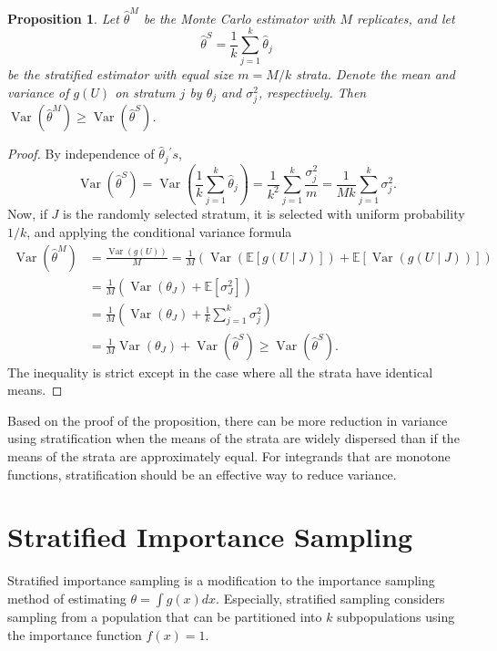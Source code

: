 \documentclass[11pt]{article}
\newtheorem{proposition}{Proposition}
\begin{document}
\begin{proposition}
Let $\widehat{\theta}^{M}$ be the Monte Carlo estimator with $M$ replicates, and let
\[
\widehat{\theta}^{S}=\frac{1}{k} \sum_{j=1}^{k} \widehat{\theta}_{j}
\]
be the stratified estimator with equal size $m=M / k$ strata. Denote the mean and variance of $g(U)$ on stratum $j$ by $\theta_{j}$ and $\sigma_{j}^{2}$, respectively. Then $\operatorname{Var}\left(\widehat{\theta}^{M}\right) \geq \operatorname{Var}\left(\widehat{\theta}^{S}\right)$.
\end{proposition}
\begin{proof}
By independence of $\widehat{\theta}_{j}{ }^{\prime} s$,
\[
\operatorname{Var}\left(\widehat{\theta}^{S}\right)=\operatorname{Var}\left(\frac{1}{k} \sum_{j=1}^{k} \widehat{\theta}_{j}\right)=\frac{1}{k^{2}} \sum_{j=1}^{k} \frac{\sigma_{j}^{2}}{m}=\frac{1}{M k} \sum_{j=1}^{k} \sigma_{j}^{2}.
\]
Now, if $J$ is the randomly selected stratum, it is selected with uniform probability $1 / k$, and applying the conditional variance formula
\begin{align*}
\operatorname{Var}\left(\widehat{\theta}^{M}\right) &=\frac{\operatorname{Var}(g(U))}{M}=\frac{1}{M}(\operatorname{Var}(\mathbb{E}[g(U \mid J)])+\mathbb{E}[\operatorname{Var}(g(U \mid J))])\\
&=\frac{1}{M}\left(\operatorname{Var}\left(\theta_{J}\right)+\mathbb{E}\left[\sigma_{J}^{2}\right]\right) \\
&=\frac{1}{M}\left(\operatorname{Var}\left(\theta_{J}\right)+\frac{1}{k} \sum_{j=1}^{k} \sigma_{j}^{2}\right) \\
&=\frac{1}{M} \operatorname{Var}\left(\theta_{J}\right)+\operatorname{Var}\left(\widehat{\theta}^{S}\right) \geq \operatorname{Var}\left(\widehat{\theta}^{S}\right).
\end{align*}
The inequality is strict except in the case where all the strata have identical means.
\end{proof}
Based on the proof of the proposition, there can be more reduction in variance using stratification when the means of the strata are widely dispersed than if the means of the strata are approximately equal. For integrands that are monotone functions, stratification should be an effective way to reduce variance.

\section{Stratified Importance Sampling}
Stratified importance sampling is a modification to the importance sampling method of estimating $\theta = \int g(x)dx$. Especially, stratified sampling considers sampling from a population that can be partitioned into $k$ subpopulations using the importance function $f(x)=1$.
\end{document}
